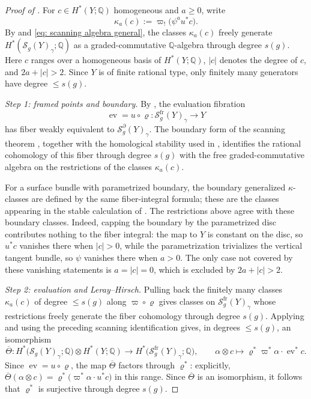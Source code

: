 \documentclass[11pt,reqno]{amsart}
\theoremstyle{plain} %
\theoremstyle{definition}
\newcommand{\QQ}{\mathbb{Q}}
\DeclareMathOperator{\ev}{ev}
\newcommand{\Sc}{\mathcal{S}}
\begin{document}
\begin{proof}[Proof of ]
For $c\in H^*(Y;\QQ)$ homogeneous and $a\geq0$, write
\[
\kappa_a(c):=\varpi_!\big(\psi^a u^*c\big).
\]
By  and \eqref{eq: scanning algebra general}, the classes $\kappa_a(c)$ freely generate $H^*(\Sc_g(Y)_\gamma;\QQ)$ as a graded-commutative $\QQ$-algebra through degree $s(g)$. Here $c$ ranges over a homogeneous basis of $H^*(Y;\QQ)$, $|c|$ denotes the degree of $c$, and  $2a+|c|>2$. Since $Y$ is of finite rational type, only finitely many generators have degree $\le s(g)$.

\smallskip
\noindent\emph{Step 1: framed points and boundary.} By , the evaluation fibration
\[
\ev=u\circ\varrho\colon\Sc^{\mathrm{fr}}_g(Y)_\gamma\longrightarrow Y
\]
has fiber weakly equivalent to $\Sc^{\partial}_g(Y)_\gamma$. The boundary form of the scanning theorem \cite[Theorem~0.1]{cohen2006surfaces}, together with the homological stability used in , identifies the rational cohomology of this fiber through degree $s(g)$ with the free graded-commutative algebra on the restrictions of the classes $\kappa_a(c)$.

For a surface bundle with parametrized boundary, the boundary generalized $\kappa$-classes are defined by the same fiber-integral formula; these are the classes appearing in the stable calculation of \cite[Corollary~0.2]{cohen2006surfaces}. The restrictions above agree with these boundary classes. Indeed, capping the boundary by the parametrized disc contributes nothing to the fiber integral: the map to $Y$ is constant on the disc, so $u^*c$ vanishes there when $|c|>0$, while the parametrization trivializes the vertical tangent bundle, so $\psi$ vanishes there when $a>0$. The only case not covered by these vanishing statements is $a=|c|=0$, which is excluded by $2a+|c|>2$.

\smallskip

\noindent\emph{Step 2: evaluation and Leray--Hirsch.} Pulling back the finitely many classes $\kappa_a(c)$ of degree $\le s(g)$ along $\varpi\circ\varrho$ gives classes on $\Sc^{\mathrm{fr}}_g(Y)_\gamma$ whose restrictions freely generate the fiber cohomology through degree $s(g)$. Applying  and using the preceding scanning identification gives, in degrees $\le s(g)$, an isomorphism
\begin{equation} \label{eq: marked framed Leray-Hirsch}
\overline\Theta\colon H^*\big(\Sc_g(Y)_\gamma;\QQ\big)\otimes H^*(Y;\QQ)\longrightarrow H^*\big(\Sc^{\mathrm{fr}}_g(Y)_\gamma;\QQ\big),\qquad \alpha\otimes c\longmapsto\varrho^*\varpi^*\alpha\cdot\ev^*c.
\end{equation}
Since $\ev=u\circ\varrho$, the map $\overline\Theta$ factors through $\varrho^*$: explicitly, $\overline\Theta(\alpha\otimes c)=\varrho^*\big(\varpi^*\alpha\cdot u^*c\big)$ in this range. Since $\overline\Theta$ is an isomorphism, it follows that $\varrho^*$ is surjective through degree $s(g)$.


\end{proof}
\end{document}
